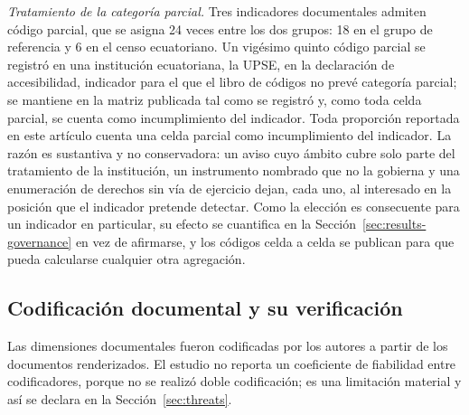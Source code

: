 \documentclass[pdflatex,sn-basic,Numbered,iicol]{sn-jnl}
\theoremstyle{thmstyleone}
\theoremstyle{thmstyletwo}
\theoremstyle{thmstylethree}
\begin{document}
\emph{Tratamiento de la categor\'ia parcial.} Tres indicadores documentales admiten c\'odigo parcial, que se asigna 24 veces entre los dos grupos: 18 en el grupo de referencia y 6 en el censo ecuatoriano. Un vig\'esimo quinto c\'odigo parcial se registr\'o en una instituci\'on ecuatoriana, la UPSE, en la declaraci\'on de accesibilidad, indicador para el que el libro de c\'odigos no prev\'e categor\'ia parcial; se mantiene en la matriz publicada tal como se registr\'o y, como toda celda parcial, se cuenta como incumplimiento del indicador. Toda proporci\'on reportada en este art\'iculo cuenta una celda parcial como incumplimiento del indicador. La raz\'on es sustantiva y no conservadora: un aviso cuyo \'ambito cubre solo parte del tratamiento de la instituci\'on, un instrumento nombrado que no la gobierna y una enumeraci\'on de derechos sin v\'ia de ejercicio dejan, cada uno, al interesado en la posici\'on que el indicador pretende detectar. Como la elecci\'on es consecuente para un indicador en particular, su efecto se cuantifica en la Secci\'on~\ref{sec:results-governance} en vez de afirmarse, y los c\'odigos celda a celda se publican para que pueda calcularse cualquier otra agregaci\'on.

\subsection{Codificaci\'on documental y su verificaci\'on}\label{sec:methods-coding}

Las dimensiones documentales fueron codificadas por los autores a partir de los documentos renderizados. El estudio no reporta un coeficiente de fiabilidad entre codificadores, porque no se realiz\'o doble codificaci\'on; es una limitaci\'on material y as\'i se declara en la Secci\'on~\ref{sec:threats}.
\end{document}
